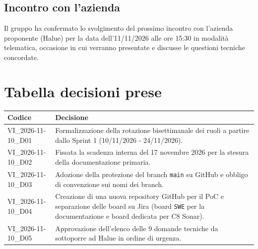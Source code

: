 \subsection{Incontro con l'azienda}
Il gruppo ha confermato lo svolgimento del prossimo incontro con l'azienda proponente (Halue) per la data dell'11/11/2026 alle ore 15:30 in modalità telematica, occasione in cui verranno presentate e discusse le questioni tecniche concordate.

\section{Tabella decisioni prese}
\renewcommand{\arraystretch}{1.3}
\noindent
\begin{tabularx}{\textwidth}{|l|X|}
    \hline
    \textbf{Codice} & \textbf{Decisione} \\
    \hline
    VI\_2026-11-10\_D01 & Formalizzazione della rotazione bisettimanale dei ruoli a partire dallo Sprint 1 (10/11/2026 - 24/11/2026). \\
    \hline
    VI\_2026-11-10\_D02 & Fissata la scadenza interna del 17 novembre 2026 per la stesura della documentazione primaria. \\
    \hline
    VI\_2026-11-10\_D03 & Adozione della protezione del branch \texttt{main} su GitHub e obbligo di convenzione sui nomi dei branch. \\
    \hline
    VI\_2026-11-10\_D04 & Creazione di una nuova repository GitHub per il PoC e separazione delle board su Jira (board \texttt{SWE} per la documentazione e board dedicata per C8 Sonar). \\
    \hline
    VI\_2026-11-10\_D05 & Approvazione dell'elenco delle 9 domande tecniche da sottoporre ad Halue in ordine di urgenza. \\
    \hline
\end{tabularx}
